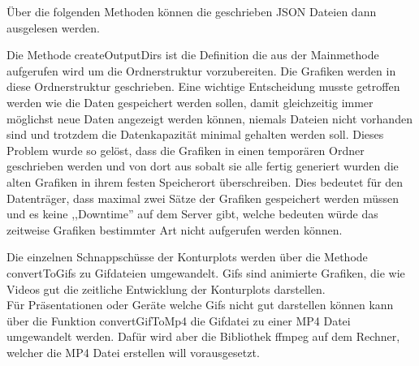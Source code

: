 Über die folgenden Methoden können die geschrieben JSON Dateien dann ausgelesen werden.

Die Methode createOutputDirs ist die Definition die aus der Mainmethode aufgerufen wird
um die Ordnerstruktur vorzubereiten. Die Grafiken werden in diese Ordnerstruktur geschrieben.
Eine wichtige Entscheidung musste getroffen werden wie die Daten gespeichert werden sollen,
damit gleichzeitig immer möglichst neue Daten angezeigt werden können, niemals Dateien nicht
vorhanden sind und trotzdem die Datenkapazität minimal gehalten werden soll.
Dieses Problem wurde so gelöst, dass die Grafiken in einen temporären Ordner geschrieben
werden und von dort aus sobalt sie alle fertig generiert wurden die alten Grafiken in
ihrem festen Speicherort überschreiben. Dies bedeutet für den Datenträger, dass maximal
zwei Sätze der Grafiken gespeichert werden müssen und es keine ,,Downtime'' auf dem
Server gibt, welche bedeuten würde das zeitweise Grafiken bestimmter Art nicht aufgerufen
werden können.

Die einzelnen Schnappschüsse der Konturplots werden über die Methode convertToGifs zu
Gifdateien umgewandelt. Gifs sind animierte Grafiken, die wie Videos gut die zeitliche
Entwicklung der Konturplots darstellen.\\
Für Präsentationen oder Geräte welche Gifs nicht gut darstellen können kann über die
Funktion convertGifToMp4 die Gifdatei zu einer MP4 Datei umgewandelt werden.
Dafür wird aber die Bibliothek ffmpeg auf dem Rechner, welcher die MP4 Datei erstellen
will vorausgesetzt.

